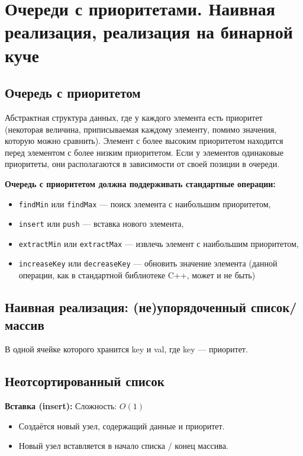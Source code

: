 \section{Очереди с приоритетами. Наивная реализация, реализация на бинарной куче}
	
\subsection*{Очередь с приоритетом} 

Абстрактная структура данных, где у каждого элемента есть приоритет (некоторая величина, приписываемая каждому элементу, помимо значения, которую можно сравнить). 
Элемент с более высоким приоритетом находится перед элементом с более низким приоритетом. 
Если у элементов одинаковые приоритеты, они располагаются в зависимости от своей позиции в очереди.

\textbf{Очередь с приоритетом должна поддерживать стандартные операции:}

\begin{itemize}
	\item \texttt{findMin} или \texttt{findMax} --- поиск элемента с наибольшим приоритетом,
	\item \texttt{insert} или \texttt{push} --- вставка нового элемента,
	\item \texttt{extractMin} или \texttt{extractMax} --- извлечь элемент с наибольшим приоритетом,
	\item \texttt{increaseKey} или \texttt{decreaseKey} --- обновить значение элемента (данной операции, как в стандартной библиотеке C++, может и не быть)
\end{itemize}

\subsection*{Наивная реализация: (не)упорядоченный список/массив} %

В одной ячейке которого хранится key и val, где key --- приоритет.

\subsection{Неотсортированный список} %

\textbf{Вставка (insert):} Сложность: $O(1)$
\begin{itemize} 
	\item Создаётся новый узел, содержащий данные и приоритет.
	\item Новый узел вставляется в начало списка / конец массива.
\end{itemize}

